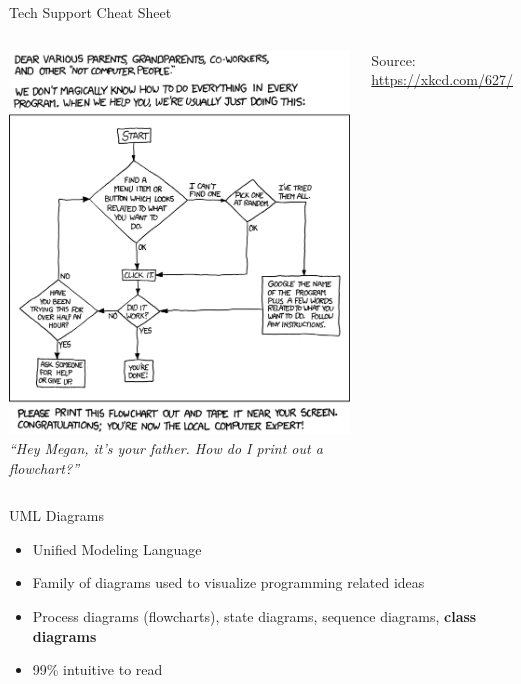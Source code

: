 \begin{frame}{Tech Support Cheat Sheet
}
%
\begin{columns}
\includegraphics[width=.8\linewidth]{./gfx/15-xkcd-tech-support-cheat-sheet}
%
\vspace{12pt}
\emph{\enquote{Hey Megan, it's your father. How do I print out a flowchart?}}

\vspace{12pt}
Source: \url{https://xkcd.com/627/}
\end{columns}
\end{frame}


\begin{frame}{UML Diagrams}
%
\begin{itemize}
\item Unified Modeling Language
\item Family of diagrams used to visualize programming related ideas
\item Process diagrams (flowcharts), state diagrams, sequence diagrams, \textbf{class diagrams}
\item 99\% intuitive to read
\end{itemize}
%
\end{frame}


